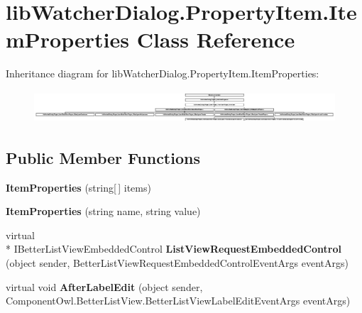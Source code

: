 \hypertarget{classlib_watcher_dialog_1_1_property_item_1_1_item_properties}{\section{lib\+Watcher\+Dialog.\+Property\+Item.\+Item\+Properties Class Reference}
\label{classlib_watcher_dialog_1_1_property_item_1_1_item_properties}
}
Inheritance diagram for lib\+Watcher\+Dialog.\+Property\+Item.\+Item\+Properties\+:\begin{figure}[H]
\begin{center}
\leavevmode
\includegraphics[height=1.215190cm]{classlib_watcher_dialog_1_1_property_item_1_1_item_properties}
\end{center}
\end{figure}
\subsection*{Public Member Functions}
\begin{DoxyCompactItemize}
\item 
\hypertarget{classlib_watcher_dialog_1_1_property_item_1_1_item_properties_a03c1e2b1ef5d0b9fff7682d3e7b9eddd}{{\bfseries Item\+Properties} (string\mbox{[}$\,$\mbox{]} items)}\label{classlib_watcher_dialog_1_1_property_item_1_1_item_properties_a03c1e2b1ef5d0b9fff7682d3e7b9eddd}

\item 
\hypertarget{classlib_watcher_dialog_1_1_property_item_1_1_item_properties_ab92195ead0d37e53a2b67a6844e79455}{{\bfseries Item\+Properties} (string name, string value)}\label{classlib_watcher_dialog_1_1_property_item_1_1_item_properties_ab92195ead0d37e53a2b67a6844e79455}

\item 
\hypertarget{classlib_watcher_dialog_1_1_property_item_1_1_item_properties_ab0a167a11df8f5b04f039bf9b7dac7cb}{virtual \\*
I\+Better\+List\+View\+Embedded\+Control {\bfseries List\+View\+Request\+Embedded\+Control} (object sender, Better\+List\+View\+Request\+Embedded\+Control\+Event\+Args event\+Args)}\label{classlib_watcher_dialog_1_1_property_item_1_1_item_properties_ab0a167a11df8f5b04f039bf9b7dac7cb}

\item 
\hypertarget{classlib_watcher_dialog_1_1_property_item_1_1_item_properties_a48ad933f12fb4681800f1d10279b28d9}{virtual void {\bfseries After\+Label\+Edit} (object sender, Component\+Owl.\+Better\+List\+View.\+Better\+List\+View\+Label\+Edit\+Event\+Args event\+Args)}\label{classlib_watcher_dialog_1_1_property_item_1_1_item_properties_a48ad933f12fb4681800f1d10279b28d9}

\end{DoxyCompactItemize}

